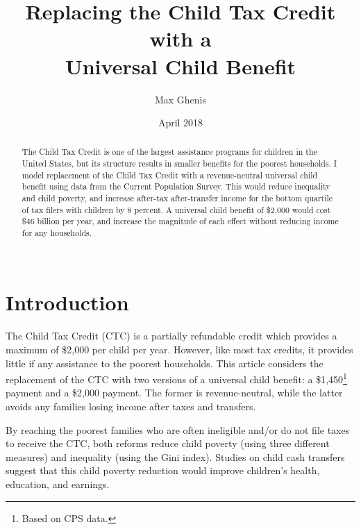 \documentclass[12pt]{article}
\begin{document}
\begin{titlepage}
\title{Replacing the Child Tax Credit with a \protect\\Universal Child Benefit}
\author{Max Ghenis}
\date{April 2018}
\maketitle
\begin{abstract}
\noindent The Child Tax Credit is one of the largest assistance programs for children in the United States, but its structure results in smaller benefits for the poorest households. I model replacement of the Child Tax Credit with a revenue-neutral universal child benefit using data from the Current Population Survey. This would reduce inequality and child poverty, and increase after-tax after-transfer income for the bottom quartile of tax filers with children by 8 percent. A universal child benefit of \$2,000 would cost \$46 billion per year, and increase the magnitude of each effect without reducing income for any households.
\vspace{1in}\\
\vspace{0in}\\

\bigskip
\end{abstract}
\setcounter{page}{0}
\thispagestyle{empty}
\end{titlepage}
\pagebreak \newpage




\doublespacing


\section{Introduction} \label{sec:introduction}

The Child Tax Credit (CTC) is a partially refundable credit which provides a maximum of \$2,000 per child per year. However, like most tax credits, it provides little if any assistance to the poorest households. This article considers the replacement of the CTC with two versions of a universal child benefit: a \$1,450\footnote{Based on CPS data.} payment and a \$2,000 payment. The former is revenue-neutral, while the latter avoids any families losing income after taxes and transfers.

By reaching the poorest families who are often ineligible and/or do not file taxes to receive the CTC, both reforms reduce child poverty (using three different measures) and inequality (using the Gini index). Studies on child cash transfers suggest that this child poverty reduction would improve children's health, education, and earnings.
\end{document}
